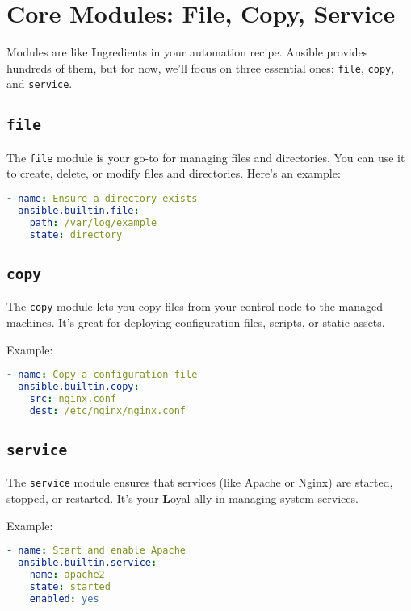\section{Core Modules: File, Copy, Service}

Modules are like \textbf{I}ngredients in your automation recipe. Ansible provides hundreds of them, but for now, we'll focus on three essential ones: \texttt{file}, \texttt{copy}, and \texttt{service}.

\subsection{\texttt{file}}

The \texttt{file} module is your go-to for managing files and directories. You can use it to create, delete, or modify files and directories. Here's an example:
\begin{lstlisting}[language=yaml, caption=Using the File Module]
- name: Ensure a directory exists
  ansible.builtin.file:
    path: /var/log/example
    state: directory
\end{lstlisting}

\subsection{\texttt{copy}}

The \texttt{copy} module lets you copy files from your control node to the managed machines. It's great for deploying configuration files, scripts, or static assets.

Example:
\begin{lstlisting}[language=yaml, caption=Using the Copy Module]
- name: Copy a configuration file
  ansible.builtin.copy:
    src: nginx.conf
    dest: /etc/nginx/nginx.conf
\end{lstlisting}

\subsection{\texttt{service}}

The \texttt{service} module ensures that services (like Apache or Nginx) are started, stopped, or restarted. It's your \textbf{L}oyal ally in managing system services.

Example:
\begin{lstlisting}[language=yaml, caption=Using the Service Module]
- name: Start and enable Apache
  ansible.builtin.service:
    name: apache2
    state: started
    enabled: yes
\end{lstlisting}


